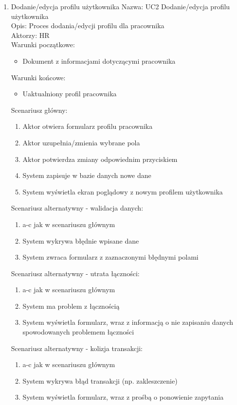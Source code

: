 \begin{enumerate}
\item Dodanie/edycja profilu użytkownika
Nazwa: UC2 Dodanie/edycja profilu użytkownika \\
Opis: Proces dodania/edycji profilu dla pracownika \\
Aktorzy: HR \\
Warunki początkowe:
\begin{itemize}
\item Dokument z informacjami dotyczącymi pracownika
\end{itemize}
Warunki końcowe: 
\begin{itemize}
\item Uaktualniony profil pracownika
\end{itemize}
Scenariusz główny:
\begin{enumerate}
\item Aktor otwiera formularz profilu pracownika
\item Aktor uzupełnia/zmienia wybrane pola
\item Aktor potwierdza zmiany odpowiednim przyciskiem
\item System zapisuje w bazie danych nowe dane
\item System wyświetla ekran poglądowy z nowym profilem użytkownika
\end{enumerate}
Scenariusz alternatywny - walidacja danych: 
\begin{enumerate}
\item a-c jak w scenariuszu głównym
\item System wykrywa błędnie wpisane dane 
\item System zwraca formularz z zaznaczonymi błędnymi polami
\end{enumerate}
Scenariusz alternatywny - utrata łączności: 
\begin{enumerate}
\item a-c jak w scenariuszu głównym
\item System ma problem z łącznością 
\item System wyświetla formularz, wraz z informacją o nie zapisaniu danych spowodowanych problemem łączności
\end{enumerate}
Scenariusz alternatywny - kolizja transakcji: 
\begin{enumerate}
\item a-c jak w scenariuszu głównym
\item System wykrywa błąd transakcji (np. zakleszczenie)
\item System wyświetla formularz, wraz z prośbą o ponowienie zapytania
\end{enumerate}


\end{enumerate}

